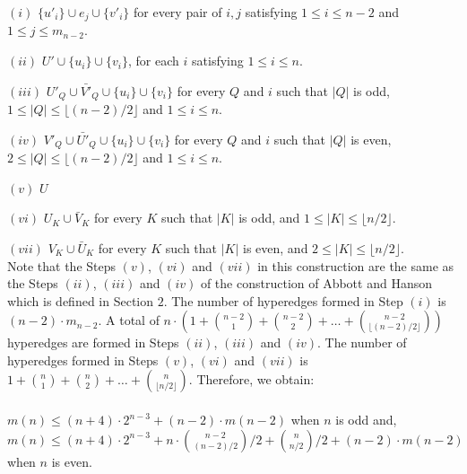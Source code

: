 \documentclass[11pt]{article}
\begin{document}
$(i)$ $\{u'_i\} \cup e_j \cup \{v'_i\}$ for every pair of $i, j$ satisfying $1 \leq i \leq n-2$ and $1 \leq j \leq m_{n-2}$.

$(ii)$ $U' \cup \{u_i\} \cup \{v_i\}$, for each $i$ satisfying $1 \leq i \leq n$.

$(iii)$ $U'_Q \cup {\bar{V'}}_Q \cup \{u_i\} \cup \{v_i\}$ for every $Q$ and $i$ such that $|Q|$ is odd, $1 \leq |Q| \leq \lfloor (n-2)/2 \rfloor$ and $1 \leq i \leq n$.

$(iv)$ $V'_Q \cup {\bar{U'}}_Q \cup \{u_i\} \cup \{v_i\}$ for every $Q$ and $i$ such that $|Q|$ is even, $2 \leq |Q| \leq \lfloor (n-2)/2 \rfloor$ and $1 \leq i \leq n$.

$(v)$ $U$

$(vi)$ $U_K \cup {\bar{V}}_K$ for every $K$ such that $|K|$ is odd, and $1 \leq |K| \leq \lfloor n/2 \rfloor$.

$(vii)$ $V_K \cup {\bar{U}}_K$ for every $K$ such that $|K|$ is even, and $2 \leq |K| \leq \lfloor n/2 \rfloor$. \\

Note that the Steps $(v)$, $(vi)$ and $(vii)$ in this construction are the same as the Steps $(ii)$, $(iii)$ and $(iv)$ of the construction of Abbott and Hanson \cite{Abbott} which is defined in Section $2$. The number of hyperedges formed in Step $(i)$ is $(n-2) \cdot m_{n-2}$. A total of $n \cdot \left( 1 + \binom{n-2}{1} + \binom{n-2}{2} + \ldots + \binom{n-2}{\lfloor (n-2)/2 \rfloor} \right)$ hyperedges are formed in Steps $(ii)$, $(iii)$ and $(iv)$. The number of hyperedges formed in Steps $(v)$, $(vi)$ and $(vii)$ is $1 + \binom{n}{1} + \binom{n}{2} + \ldots + \binom{n}{\lfloor n/2 \rfloor}$. Therefore, we obtain:\\\\
$m(n) \leq (n+4) \cdot 2^{n-3} + (n-2) \cdot m(n-2)$ when $n$ is odd and,\\ 
$m(n) \leq (n+4) \cdot 2^{n-3} +n \cdot {n-2 \choose {(n-2)/2}}/{2} + {n \choose {n / 2}}/{2} + (n-2) \cdot m(n-2)$ when $n$ is even.\\
\end{document}
